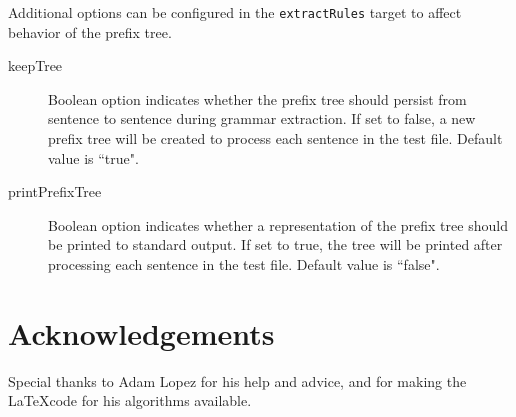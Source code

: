 \documentclass{pbml}
\begin{document}
Additional options can be configured in the {\tt extractRules} target to affect behavior of the prefix tree.

\begin{description}
	\item[keepTree] Boolean option indicates whether the prefix tree should persist from sentence to sentence during grammar extraction. If set to false, a new prefix tree will be created to process each sentence in the test file. Default value is ``true".

	\item[printPrefixTree] Boolean option indicates whether a representation of the prefix tree should be printed to standard output. If set to true, the tree will be printed after processing each sentence in the test file. Default value is ``false".

\end{description}


\section*{Acknowledgements}

Special thanks to Adam Lopez for his help and advice, and for making the \LaTeX code for his algorithms available. 




% 
\end{document}
